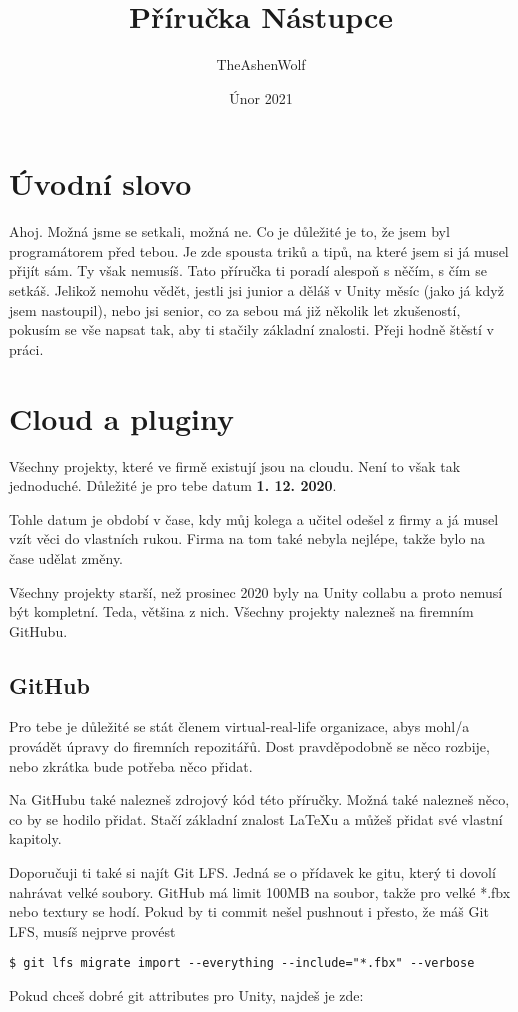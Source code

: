 \documentclass{article}
\title{Příručka Nástupce}
\author{TheAshenWolf}
\date{Únor 2021}
\begin{document}
\clearpage
\maketitle
\thispagestyle{empty}

\pagebreak

\renewcommand{\contentsname}{Obsah}
\tableofcontents

\pagebreak

\section{Úvodní slovo}
Ahoj. Možná jsme se setkali, možná ne. Co je důležité je to, že jsem byl programátorem před tebou. Je zde spousta triků a tipů, na které jsem si já musel přijít sám. Ty však nemusíš. Tato příručka ti poradí alespoň s něčím, s čím se setkáš. Jelikož nemohu vědět, jestli jsi junior a děláš v Unity měsíc (jako já když jsem nastoupil), nebo jsi senior, co za sebou má již několik let zkušeností, pokusím se vše napsat tak, aby ti stačily základní znalosti. Přeji hodně štěstí v práci.
\pagebreak

\section{Cloud a pluginy}
Všechny projekty, které ve firmě existují jsou na cloudu. Není to však tak jednoduché. Důležité je pro tebe datum \textbf{1. 12. 2020}. 

Tohle datum je období v čase, kdy můj kolega a učitel odešel z firmy a já musel vzít věci do vlastních rukou. Firma na tom také nebyla nejlépe, takže bylo na čase udělat změny.

Všechny projekty starší, než prosinec 2020 byly na Unity collabu a proto nemusí být kompletní. Teda, většina z nich. Všechny projekty nalezneš na firemním GitHubu.

\subsection{GitHub}
Pro tebe je důležité se stát členem virtual-real-life organizace, abys mohl/a provádět úpravy do firemních repozitářů. Dost pravděpodobně se něco rozbije, nebo zkrátka bude potřeba něco přidat.

Na GitHubu také nalezneš zdrojový kód této příručky. Možná také nalezneš něco, co by se hodilo přidat.
Stačí základní znalost LaTeXu a můžeš přidat své vlastní kapitoly.

Doporučuji ti také si najít Git LFS. Jedná se o přídavek ke gitu, který ti dovolí nahrávat velké soubory. GitHub má limit 100MB na soubor, takže pro velké *.fbx nebo textury se hodí. Pokud by ti commit nešel pushnout i přesto, že máš Git LFS, musíš nejprve provést 
\begin{lstlisting}
$ git lfs migrate import --everything --include="*.fbx" --verbose
\end{lstlisting}
Pokud chceš dobré git attributes pro Unity, najdeš je zde:
\end{document}
